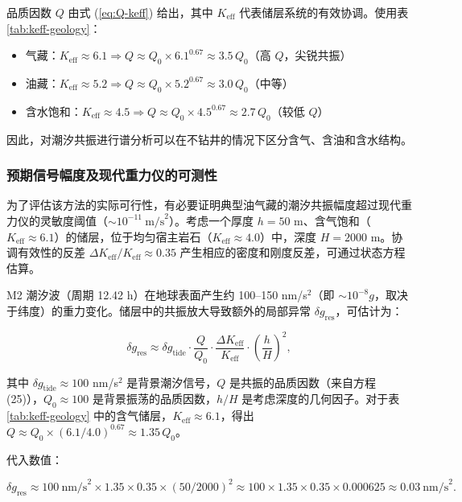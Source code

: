 \documentclass[12pt,a4paper]{article}
\theoremstyle{remark}
\newcommand{\Keff}{K_{\mathrm{eff}}}
\begin{document}
	品质因数 $Q$ 由式 (\ref{eq:Q-keff}) 给出，其中 $\Keff$ 代表储层系统的有效协调。使用表 \ref{tab:keff-geology}：
	
	\begin{itemize}
		\item 气藏：$\Keff \approx 6.1 \Rightarrow Q \approx Q_0 \times 6.1^{0.67} \approx 3.5\,Q_0$（高 $Q$，尖锐共振）
		\item 油藏：$\Keff \approx 5.2 \Rightarrow Q \approx Q_0 \times 5.2^{0.67} \approx 3.0\,Q_0$（中等）
		\item 含水饱和：$\Keff \approx 4.5 \Rightarrow Q \approx Q_0 \times 4.5^{0.67} \approx 2.7\,Q_0$（较低 $Q$）
	\end{itemize}
	
	因此，对潮汐共振进行谱分析可以在不钻井的情况下区分含气、含油和含水结构。
	
	\subsubsection{预期信号幅度及现代重力仪的可测性}
	\label{subsubsec:signal_amplitude}
	
	为了评估该方法的实际可行性，有必要证明典型油气藏的潮汐共振幅度超过现代重力仪的灵敏度阈值（\( \sim 10^{-11}\ \text{m/s}^2\)）。考虑一个厚度 \(h = 50\) m、含气饱和（\(\Keff \approx 6.1\)）的储层，位于均匀宿主岩石（\(\Keff \approx 4.0\)）中，深度 \(H = 2000\) m。协调有效性的反差 \(\Delta \Keff / \Keff \approx 0.35\) 产生相应的密度和刚度反差，可通过状态方程估算。
	
	M2 潮汐波（周期 12.42 h）在地球表面产生约 100–150 nm/s\(^2\)（即 \(\sim 10^{-8} g\)，取决于纬度）的重力变化。储层中的共振放大导致额外的局部异常 \(\delta g_{\text{res}}\)，可估计为：
	
	\begin{equation}
		\delta g_{\text{res}} \approx \delta g_{\text{tide}} \cdot \frac{Q}{Q_0} \cdot \frac{\Delta \Keff}{\Keff} \cdot \left(\frac{h}{H}\right)^2,
		\label{eq:signal_estimate}
	\end{equation}
	
	其中 \(\delta g_{\text{tide}} \approx 100\) nm/s\(^2\) 是背景潮汐信号，\(Q\) 是共振的品质因数（来自方程 (25)），\(Q_0 \approx 100\) 是背景振荡的品质因数，\(h/H\) 是考虑深度的几何因子。对于表 \ref{tab:keff-geology} 中的含气储层，\(\Keff \approx 6.1\)，得出 \(Q \approx Q_0 \times (6.1/4.0)^{0.67} \approx 1.35\,Q_0\)。
	
	代入数值：
	
	\[
	\delta g_{\text{res}} \approx 100\ \text{nm/s}^2 \times 1.35 \times 0.35 \times (50/2000)^2 \approx 100 \times 1.35 \times 0.35 \times 0.000625 \approx 0.03\ \text{nm/s}^2.
	\]
	
\end{document}
